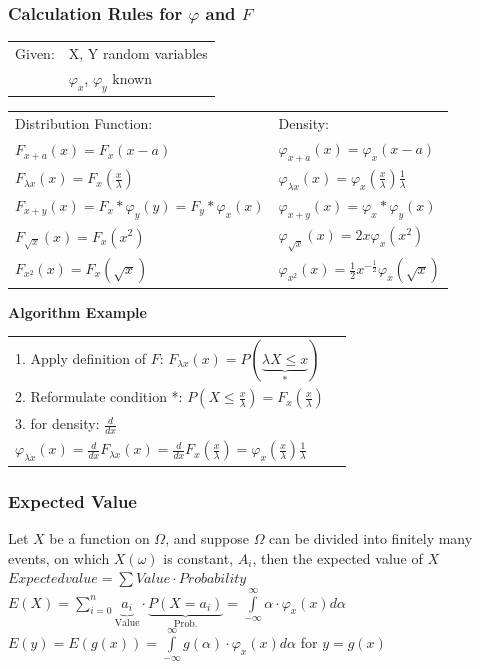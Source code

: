 		\subsubsection{Calculation Rules for $\varphi$ and $F$ }
			\begin{minipage}{11cm}
				\begin{tabular}{ll}
				Given: &X, Y random variables\\
				&$\varphi_x$, $\varphi_y$ known\\
				\end{tabular}

				\begin{tabular}{p{6cm}p{6cm}}
				Distribution Function: &Density:\\
				$F_{x+a}(x)=F_x(x-a)$  &$\varphi_{x+a}(x)=\varphi_x(x-a)$\\
				$F_{\lambda x}(x)=F_x(\frac{x}{\lambda})$ &$\varphi_{\lambda
				x}(x)=\varphi_x(\frac{x}{\lambda})\frac{1}{\lambda}$\\
				$F_{x+y}(x)=F_x\ast\varphi_y(y)=F_y\ast\varphi_x(x)$ &
				$\varphi_{x+y}(x)=\varphi_x\ast\varphi_y(x)$\\
				$F_{\sqrt{x}}(x)=F_x(x^2)$ &
				$\varphi_{\sqrt{x}}(x)=2x\varphi_x(x^2)$\\
				$F_{x^2}(x)=F_x(\sqrt{x})$ &
				$\varphi_{x^2}(x)=\frac{1}{2}x^{-\frac{1}{2}}\varphi_x(\sqrt{x})$
				\end{tabular}
			\end{minipage}
			\begin{minipage}{7cm}
				\textbf{Algorithm Example}
				\begin{tabular}{ll}
				1. Apply definition of $F$: $F_{\lambda x}(x)=P(\underbrace
				{\lambda X\leq x}_{*})$\\
				2. Reformulate condition *: $P(X \leq
				\frac{x}{\lambda})=F_x(\frac{x}{\lambda})$\\
				3. for density: $\frac{d}{dx}$\\
				\vspace{3mm}
				$\varphi_{\lambda x}(x)=\frac{d}{dx}F_{\lambda
				x}(x)=\frac{d}{dx}F_x(\frac{x}{\lambda})=
				\varphi_x(\frac{x}{\lambda})\frac{1}{\lambda}$
				\end{tabular}
				\vspace{10mm}
			\end{minipage}


		\subsubsection{Expected Value}
			Let $X$ be a function on $\Omega$, and suppose $\Omega$ can be divided into finitely many
			events, on which $X(\omega)$ is constant, $A_i$, then the expected value of $X$\\
			$Expected value = \sum Value \cdot Probability$\\
			$E(X)=\sum\limits_{i=0}^n \underbrace{a_i}_{\text{Value}}\cdot \underbrace{P(X=a_i)}_{\text{Prob.}}=\int\limits_{-\infty}^\infty \alpha \cdot \varphi_x(x)d\alpha$\\
			$E(y)=E(g(x))=\int\limits_{-\infty}^\infty g(\alpha) \cdot \varphi_x(x)d\alpha$ \hspace{2mm} for $y=g(x)$\\


